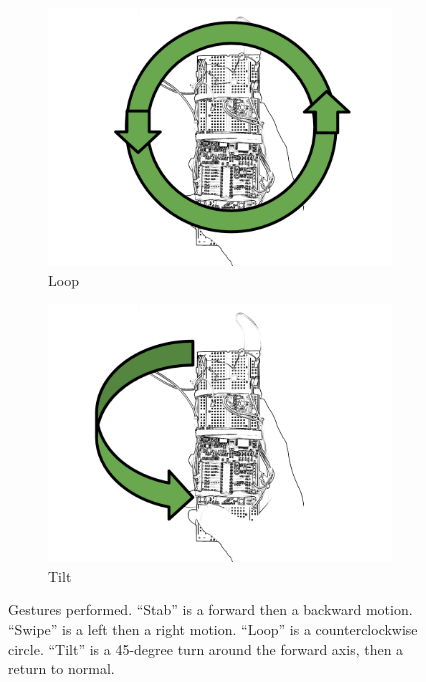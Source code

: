 \documentclass[12pt]{article}
\begin{document}
\begin{figure}[h!]
\begin{center}
\begin{subfigure}[b]{0.2\textwidth}
            \includegraphics[width=\textwidth]{gesture-loop.png}
            \caption{Loop}
            \label{fig:loop}
    \end{subfigure}
    \begin{subfigure}[b]{0.2\textwidth}
            \includegraphics[width=\textwidth]{gesture-tilt.png}
            \caption{Tilt}
            \label{fig:tilt}
    \end{subfigure}
    \caption{Gestures performed. ``Stab'' is a forward then a backward motion.
    ``Swipe'' is a left then a right motion. ``Loop'' is a counterclockwise
    circle. ``Tilt'' is a 45-degree turn around the forward axis, then a return
    to normal.}
    \label{fig:gestures}
\end{center}
\end{figure}
\end{document}
